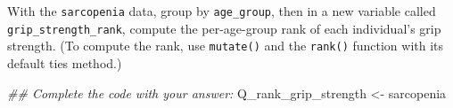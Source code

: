 \documentclass[
  letterpaper,
  DIV=11,
  numbers=noendperiod]{scrreprt}
\newenvironment{Shaded}{\begin{snugshade}}{\end{snugshade}}
\newcommand{\DocumentationTok}[1]{\textcolor[rgb]{0.37,0.37,0.37}{\textit{#1}}}
\newcommand{\NormalTok}[1]{\textcolor[rgb]{0.00,0.23,0.31}{#1}}
\newcommand{\OtherTok}[1]{\textcolor[rgb]{0.00,0.23,0.31}{#1}}
\begin{document}
\begin{tcolorbox}[enhanced jigsaw, titlerule=0mm, colback=white, left=2mm, breakable, opacitybacktitle=0.6, colbacktitle=quarto-callout-tip-color!10!white, colframe=quarto-callout-tip-color-frame, bottomtitle=1mm, opacityback=0, coltitle=black, arc=.35mm, toptitle=1mm, title=\textcolor{quarto-callout-tip-color}{\faLightbulb}\hspace{0.5em}{Practice}, leftrule=.75mm, toprule=.15mm, bottomrule=.15mm, rightrule=.15mm]

With the \texttt{sarcopenia} data, group by \texttt{age\_group}, then in
a new variable called \texttt{grip\_strength\_rank}, compute the
per-age-group rank of each individual's grip strength. (To compute the
rank, use \texttt{mutate()} and the \texttt{rank()} function with its
default ties method.)

\begin{Shaded}
\begin{Highlighting}[]
\DocumentationTok{\#\# Complete the code with your answer:}
\NormalTok{Q\_rank\_grip\_strength }\OtherTok{\textless{}{-}} 
\NormalTok{  sarcopenia}
\end{Highlighting}
\end{Shaded}

\end{tcolorbox}
\end{document}
